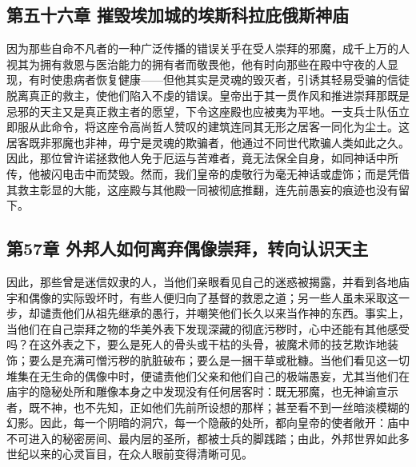 
\subsection{第五十六章 摧毁埃加城的埃斯科拉庇俄斯神庙}

因为那些自命不凡者的一种广泛传播的错误关乎在受人崇拜的邪魔，成千上万的人视其为拥有救恩与医治能力的拥有者而敬畏他，他有时向那些在殿中守夜的人显现，有时使患病者恢复健康——但他其实是灵魂的毁灭者，引诱其轻易受骗的信徒脱离真正的救主，使他们陷入不虔的错误。皇帝出于其一贯作风和推进崇拜那既是忌邪的天主又是真正救主者的愿望，下令这座殿也应被夷为平地。一支兵士队伍立即服从此命令，将这座令高尚哲人赞叹的建筑连同其无形之居客一同化为尘土。这居客既非邪魔也非神，毋宁是灵魂的欺骗者，他通过不同世代欺骗人类如此之久。因此，那位曾许诺拯救他人免于厄运与苦难者，竟无法保全自身，如同神话中所传，他被闪电击中而焚毁。然而，我们皇帝的虔敬行为毫无神话或虚饰；而是凭借其救主彰显的大能，这座殿与其他殿一同被彻底推翻，连先前愚妄的痕迹也没有留下。\par


\subsection{第57章 外邦人如何离弃偶像崇拜，转向认识天主}

因此，那些曾是迷信奴隶的人，当他们亲眼看见自己的迷惑被揭露，并看到各地庙宇和偶像的实际毁坏时，有些人便归向了基督的救恩之道；另一些人虽未采取这一步，却谴责他们从祖先继承的愚行，并嘲笑他们长久以来当作神的东西。事实上，当他们在自己崇拜之物的华美外表下发现深藏的彻底污秽时，心中还能有其他感受吗？在这外表之下，要么是死人的骨头或干枯的头骨，被魔术师的技艺欺诈地装饰；要么是充满可憎污秽的肮脏破布；要么是一捆干草或秕糠。当他们看见这一切堆集在无生命的偶像中时，便谴责他们父亲和他们自己的极端愚妄，尤其当他们在庙宇的隐秘处所和雕像本身之中发现没有任何居客时：既无邪魔，也无神谕宣示者，既不神，也不先知，正如他们先前所设想的那样；甚至看不到一丝暗淡模糊的幻影。因此，每一个阴暗的洞穴，每一个隐蔽的处所，都向皇帝的使者敞开：庙中不可进入的秘密房间、最内层的圣所，都被士兵的脚践踏；由此，外邦世界如此多世纪以来的心灵盲目，在众人眼前变得清晰可见。\par


